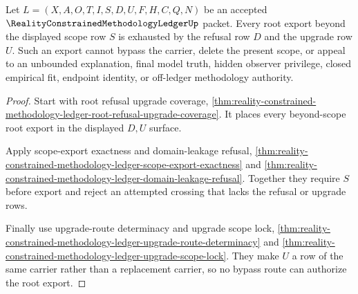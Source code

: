 \begin{theorem}
\label{thm:reality-constrained-methodology-ledger-root-upgrade-refusal-totality}
Let $L=(X,A,O,T,I,S,D,U,F,H,C,Q,N)$ be an accepted
$\RealityConstrainedMethodologyLedgerUp$ packet. Every root export beyond the
displayed scope row $S$ is exhausted by the refusal row $D$ and the upgrade row
$U$. Such an export cannot bypass the carrier, delete the present scope, or
appeal to an unbounded explanation, final model truth, hidden observer
privilege, closed empirical fit, endpoint identity, or off-ledger methodology
authority.
\end{theorem}
\begin{proof}
Start with root refusal upgrade coverage,
\autoref{thm:reality-constrained-methodology-ledger-root-refusal-upgrade-coverage}.
It places every beyond-scope root export in the displayed $D,U$ surface.

Apply scope-export exactness and domain-leakage refusal,
\autoref{thm:reality-constrained-methodology-ledger-scope-export-exactness}
and
\autoref{thm:reality-constrained-methodology-ledger-domain-leakage-refusal}.
Together they require $S$ before export and reject an attempted crossing that
lacks the refusal or upgrade rows.

Finally use upgrade-route determinacy and upgrade scope lock,
\autoref{thm:reality-constrained-methodology-ledger-upgrade-route-determinacy}
and
\autoref{thm:reality-constrained-methodology-ledger-upgrade-scope-lock}. They
make $U$ a row of the same carrier rather than a replacement carrier, so no
bypass route can authorize the root export.
\end{proof}

